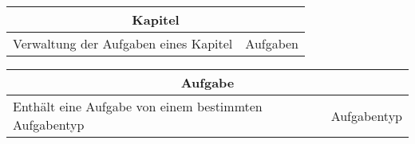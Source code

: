 \documentclass[11pt]{article}
\begin{document}
\begin{table}[h]
\begin{tabularx}{\textwidth}{|X|X|}
\hline
\multicolumn{2}{|c|}{Kapitel}\\ \hline
Verwaltung der Aufgaben eines Kapitel&Aufgaben   \\  \hline
\end{tabularx}

\end{table}

\begin{table}[h]
\begin{tabularx}{\textwidth}{|X|X|}
\hline
\multicolumn{2}{|c|}{Aufgabe}\\ \hline
Enthält eine Aufgabe von einem bestimmten Aufgabentyp&Aufgabentyp   \\  \hline
\end{tabularx}

\end{table}
\end{document}
